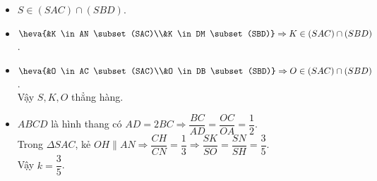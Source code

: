 \begin{bt}
{\begin{enumerate}
\begin{center}
\begin{tikzpicture}[scale=1, font=\footnotesize, line join=round, line cap=round, >=stealth]
				\end{tikzpicture}
			\end{center}
			\begin{itemize}
				\item $S \in (SAC) \cap (SBD)$.
				\item $\heva{&K \in AN \subset (SAC)\\&K \in DM \subset (SBD)} \Rightarrow K \in (SAC) \cap (SBD)$.
				\item $\heva{&O \in AC \subset (SAC)\\&O \in DB \subset (SBD)} \Rightarrow O \in (SAC) \cap (SBD)$.\\
				Vậy $S,K,O$ thẳng hàng.
				\item $ABCD$ là hình thang có $AD = 2BC \Rightarrow \dfrac{BC}{AD}=\dfrac{OC}{OA}=\dfrac{1}{2}$.\\
				Trong  $\Delta SAC$, kẻ $OH \parallel AN \Rightarrow \dfrac{CH}{CN}=\dfrac{1}{3} \Rightarrow \dfrac{SK}{SO}=\dfrac{SN}{SH}=\dfrac{3}{5}$.\\
				Vậy $k =\dfrac{3}{5}$.
			\end{itemize}
		\end{enumerate}
	}
\end{bt}
